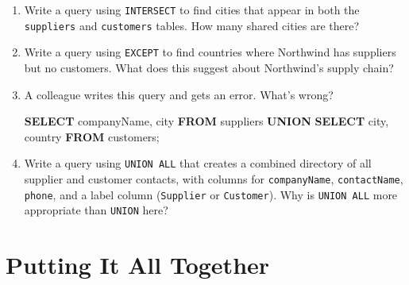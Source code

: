\documentclass[
  letterpaper,
  DIV=11,
  numbers=noendperiod]{scrreprt}
\newenvironment{Shaded}{\begin{snugshade}}{\end{snugshade}}
\newcommand{\KeywordTok}[1]{\textcolor[rgb]{0.00,0.23,0.31}{\textbf{#1}}}
\newcommand{\NormalTok}[1]{\textcolor[rgb]{0.00,0.23,0.31}{#1}}
\begin{document}
\begin{tcolorbox}[enhanced jigsaw, opacitybacktitle=0.6, arc=.35mm, colback=white, bottomtitle=1mm, opacityback=0, toprule=.15mm, left=2mm, colbacktitle=quarto-callout-note-color!10!white, breakable, coltitle=black, toptitle=1mm, colframe=quarto-callout-note-color-frame, bottomrule=.15mm, titlerule=0mm, title=\textcolor{quarto-callout-note-color}{\faInfo}\hspace{0.5em}{Exercises}, rightrule=.15mm, leftrule=.75mm]

\begin{enumerate}
\def\labelenumi{\arabic{enumi}.}
\item
  Write a query using \texttt{INTERSECT} to find cities that appear in
  both the \texttt{suppliers} and \texttt{customers} tables. How many
  shared cities are there?
\item
  Write a query using \texttt{EXCEPT} to find countries where Northwind
  has suppliers but no customers. What does this suggest about
  Northwind's supply chain?
\item
  A colleague writes this query and gets an error. What's wrong?

  \begin{codelisting}

  \caption{\texttt{duckdb}}

\begin{Shaded}
\begin{Highlighting}[]
\KeywordTok{SELECT}\NormalTok{ companyName, city }\KeywordTok{FROM}\NormalTok{ suppliers}
\KeywordTok{UNION}
\KeywordTok{SELECT}\NormalTok{ city, country }\KeywordTok{FROM}\NormalTok{ customers;}
\end{Highlighting}
\end{Shaded}

  \end{codelisting}
\item
  Write a query using \texttt{UNION\ ALL} that creates a combined
  directory of all supplier and customer contacts, with columns for
  \texttt{companyName}, \texttt{contactName}, \texttt{phone}, and a
  label column (\texttt{\textquotesingle{}Supplier\textquotesingle{}} or
  \texttt{\textquotesingle{}Customer\textquotesingle{}}). Why is
  \texttt{UNION\ ALL} more appropriate than \texttt{UNION} here?
\end{enumerate}

\end{tcolorbox}

\section{Putting It All Together}\label{putting-it-all-together}
\end{document}
